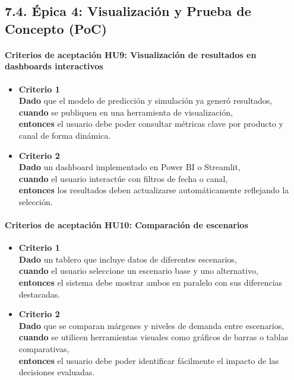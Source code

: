 \documentclass[
11pt, %
]{charter}
\begin{document}
\subsection*{7.4. Épica 4: Visualización y Prueba de Concepto (PoC)}

\paragraph{Criterios de aceptación HU9: Visualización de resultados en dashboards interactivos}
\begin{itemize}
  \item \textbf{Criterio 1} \\
  \textbf{Dado} que el modelo de predicción y simulación ya generó resultados, \\
  \textbf{cuando} se publiquen en una herramienta de visualización, \\
  \textbf{entonces} el usuario debe poder consultar métricas clave por producto y canal de forma dinámica.
  
  \item \textbf{Criterio 2} \\
  \textbf{Dado} un dashboard implementado en Power BI o Streamlit, \\
  \textbf{cuando} el usuario interactúe con filtros de fecha o canal, \\
  \textbf{entonces} los resultados deben actualizarse automáticamente reflejando la selección.
\end{itemize}

\vspace{1em}

\paragraph{Criterios de aceptación HU10: Comparación de escenarios}
\begin{itemize}
  \item \textbf{Criterio 1} \\
  \textbf{Dado} un tablero que incluye datos de diferentes escenarios, \\
  \textbf{cuando} el usuario seleccione un escenario base y uno alternativo, \\
  \textbf{entonces} el sistema debe mostrar ambos en paralelo con sus diferencias destacadas.

  \item \textbf{Criterio 2} \\
  \textbf{Dado} que se comparan márgenes y niveles de demanda entre escenarios, \\
  \textbf{cuando} se utilicen herramientas visuales como gráficos de barras o tablas comparativas, \\
  \textbf{entonces} el usuario debe poder identificar fácilmente el impacto de las decisiones evaluadas.
\end{itemize}
\end{document}
